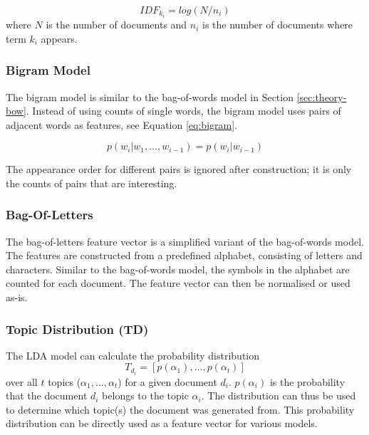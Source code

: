 \begin{equation*} \label{eq:idf}
    IDF_{k_i} = log(N / n_i)
\end{equation*}
where $N$ is the number of documents and $n_i$ is the number of documents where term $k_i$ appears.

\subsubsection{Bigram Model} \label{sec:theory-bigram}
The bigram model is similar to the bag-of-words model in Section \ref{sec:theory-bow}.
Instead of using counts of single words, the bigram model uses pairs of adjacent words as features, see Equation \ref{eq:bigram}.

\begin{equation} \label{eq:bigram}
    p(w_i|w_1, \ldots, w_{i-1}) = p(w_i|w_{i-1})
\end{equation}

The appearance order for different pairs is ignored after construction; it is only the counts of pairs that are interesting.

\subsubsection{Bag-Of-Letters} \label{sec:theory-letters}
The bag-of-letters feature vector is a simplified variant of the bag-of-words model.
The features are constructed from a predefined alphabet, consisting of letters and characters.
Similar to the bag-of-words model, the symbols in the alphabet are counted for each document.
The feature vector can then be normalised or used as-is.

\subsubsection{Topic Distribution (TD)}
The LDA model can calculate the probability distribution $$T_{d_i}=[p(\alpha_1),\ldots,p(\alpha_t)]$$ over all $t$ topics ($\alpha_1,\ldots,\alpha_t$) for a given document $d_i$.
$p(\alpha_i)$ is the probability that the document $d_i$ belongs to the topic $\alpha_i$.
The distribution can thus be used to determine which topic(s) the document was generated from.
This probability distribution can be directly used as a feature vector for various models.

